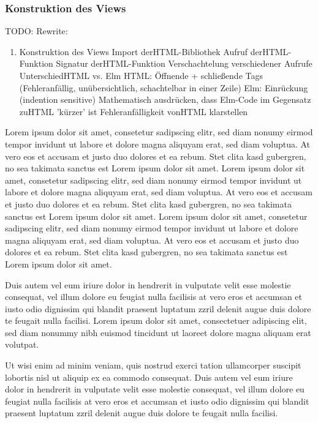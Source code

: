 \subsubsection{Konstruktion des Views}
\label{sec:Konstruktion des Views}
TODO: Rewrite:
\begin{enumerate}
	\item Konstruktion des Views
	\subitem{-} Import der\ac{HTML}-Bibliothek
	\subitem{-} Aufruf der\ac{HTML}-Funktion
	\subitem{-} Signatur der\ac{HTML}-Funktion
	\subitem{-} Verschachtelung verschiedener Aufrufe
	\subitem{-} Unterschied\ac{HTML} vs. Elm
		\subsubitem{-}\ac{HTML}: Öffnende + schließende Tags (Fehleranfällig, unübersichtlich, schachtelbar in einer Zeile)
		\subsubitem{-} Elm: Einrückung (indention sensitive)
	\subitem{-} Mathematisch ausdrücken, dass Elm-Code im Gegensatz zu\ac{HTML} 'kürzer' ist
	\subitem{-} Fehleranfälligkeit von\ac{HTML} klarstellen
\end{enumerate}


Lorem ipsum dolor sit amet, consetetur sadipscing elitr, sed diam nonumy eirmod tempor invidunt ut labore et dolore magna aliquyam erat, sed diam voluptua. At vero eos et accusam et justo duo dolores et ea rebum. Stet clita kasd gubergren, no sea takimata sanctus est Lorem ipsum dolor sit amet. Lorem ipsum dolor sit amet, consetetur sadipscing elitr, sed diam nonumy eirmod tempor invidunt ut labore et dolore magna aliquyam erat, sed diam voluptua. At vero eos et accusam et justo duo dolores et ea rebum. Stet clita kasd gubergren, no sea takimata sanctus est Lorem ipsum dolor sit amet. Lorem ipsum dolor sit amet, consetetur sadipscing elitr, sed diam nonumy eirmod tempor invidunt ut labore et dolore magna aliquyam erat, sed diam voluptua. At vero eos et accusam et justo duo dolores et ea rebum. Stet clita kasd gubergren, no sea takimata sanctus est Lorem ipsum dolor sit amet.   

Duis autem vel eum iriure dolor in hendrerit in vulputate velit esse molestie consequat, vel illum dolore eu feugiat nulla facilisis at vero eros et accumsan et iusto odio dignissim qui blandit praesent luptatum zzril delenit augue duis dolore te feugait nulla facilisi. Lorem ipsum dolor sit amet, consectetuer adipiscing elit, sed diam nonummy nibh euismod tincidunt ut laoreet dolore magna aliquam erat volutpat.   

Ut wisi enim ad minim veniam, quis nostrud exerci tation ullamcorper suscipit lobortis nisl ut aliquip ex ea commodo consequat. Duis autem vel eum iriure dolor in hendrerit in vulputate velit esse molestie consequat, vel illum dolore eu feugiat nulla facilisis at vero eros et accumsan et iusto odio dignissim qui blandit praesent luptatum zzril delenit augue duis dolore te feugait nulla facilisi.   


